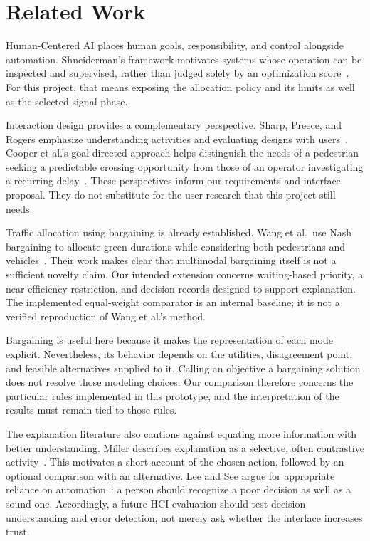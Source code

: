 \documentclass[sigconf]{acmart}
\begin{document}
\section{Related Work}
Human-Centered AI places human goals, responsibility, and control
alongside automation. Shneiderman's framework motivates systems whose
operation can be inspected and supervised, rather than judged solely by
an optimization score~\cite{shneiderman2022hcai}. For this project,
that means exposing the allocation policy and its limits as well as the
selected signal phase.

Interaction design provides a complementary perspective. Sharp,
Preece, and Rogers emphasize understanding activities and evaluating
designs with users~\cite{sharp2019interaction}. Cooper et al.'s
goal-directed approach helps distinguish the needs of a pedestrian
seeking a predictable crossing opportunity from those of an operator
investigating a recurring delay~\cite{cooper2014aboutface}. These
perspectives inform our requirements and interface proposal. They do
not substitute for the user research that this project still needs.

Traffic allocation using bargaining is already established. Wang et
al.\ use Nash bargaining to allocate green durations while considering
both pedestrians and vehicles~\cite{wang2023bargaining}. Their work
makes clear that multimodal bargaining itself is not a sufficient
novelty claim. Our intended extension concerns waiting-based priority,
a near-efficiency restriction, and decision records designed to support
explanation. The implemented equal-weight comparator is an internal
baseline; it is not a verified reproduction of Wang et al.'s method.

Bargaining is useful here because it makes the representation of each
mode explicit. Nevertheless, its behavior depends on the utilities,
disagreement point, and feasible alternatives supplied to it. Calling
an objective a bargaining solution does not resolve those modeling
choices. Our comparison therefore concerns the particular rules
implemented in this prototype, and the interpretation of the results
must remain tied to those rules.

The explanation literature also cautions against equating more
information with better understanding. Miller describes explanation
as a selective, often contrastive activity~\cite{miller2019explanation}.
This motivates a short account of the chosen action, followed by an
optional comparison with an alternative. Lee and See argue for
appropriate reliance on automation~\cite{lee2004trust}: a person should
recognize a poor decision as well as a sound one. Accordingly, a future
HCI evaluation should test decision understanding and error detection,
not merely ask whether the interface increases trust.
\end{document}
